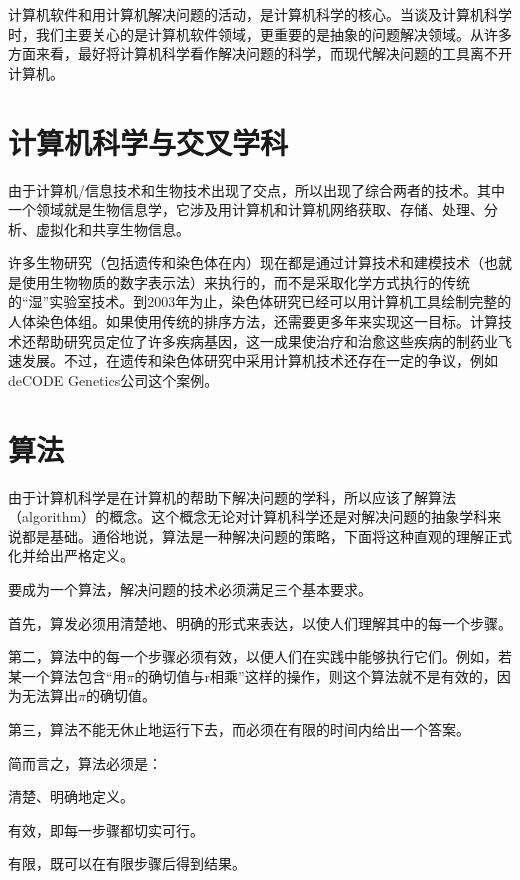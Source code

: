 计算机软件和用计算机解决问题的活动，是计算机科学的核心。当谈及计算机科学时，我们主要关心的是计算机软件领域，更重要的是抽象的问题解决领域。从许多方面来看，最好将计算机科学看作解决问题的科学，而现代解决问题的工具离不开计算机。

\section{计算机科学与交叉学科}

由于计算机/信息技术和生物技术出现了交点，所以出现了综合两者的技术。其中一个领域就是生物信息学，它涉及用计算机和计算机网络获取、存储、处理、分析、虚拟化和共享生物信息。

许多生物研究（包括遗传和染色体在内）现在都是通过计算技术和建模技术（也就是使用生物物质的数字表示法）来执行的，而不是采取化学方式执行的传统的“湿”实验室技术。到2003年为止，染色体研究已经可以用计算机工具绘制完整的人体染色体组。如果使用传统的排序方法，还需要更多年来实现这一目标。计算技术还帮助研究员定位了许多疾病基因，这一成果使治疗和治愈这些疾病的制药业飞速发展。不过，在遗传和染色体研究中采用计算机技术还存在一定的争议，例如deCODE Genetics公司这个案例。

\section{算法}

由于计算机科学是在计算机的帮助下解决问题的学科，所以应该了解算法（algorithm）的概念。这个概念无论对计算机科学还是对解决问题的抽象学科来说都是基础。通俗地说，算法是一种解决问题的策略，下面将这种直观的理解正式化并给出严格定义。

要成为一个算法，解决问题的技术必须满足三个基本要求。

首先，算发必须用清楚地、明确的形式来表达，以使人们理解其中的每一个步骤。

第二，算法中的每一个步骤必须有效，以便人们在实践中能够执行它们。例如，若某一个算法包含“用$\pi$的确切值与r相乘”这样的操作，则这个算法就不是有效的，因为无法算出$\pi$的确切值。

第三，算法不能无休止地运行下去，而必须在有限的时间内给出一个答案。

简而言之，算法必须是：

\begin{compactenum}
\item 清楚、明确地定义。
\item 有效，即每一步骤都切实可行。
\item 有限，既可以在有限步骤后得到结果。
\end{compactenum}

